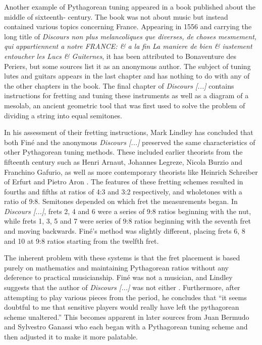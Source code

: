 Another example of Pythagorean tuning appeared in a book published about the middle of sixteenth-
century.  The book was not about music but instead contained various topics concerning France.
Appearing in 1556 and carrying the long title of \textit{Discours non plus melancoliques que
diverses, de choses mesmement, qui appartiennent a notre FRANCE: \& a la fin La maniere de bien \&
iustement entoucher les Lucs \& Guiternes}, it has been attributed to Bonaventure des Periers, but
some sources list it as an anonymous author. The subject of tuning lutes and guitars appears in the
last chapter and has nothing to do with any of the other chapters in the book. The final chapter of
\textit{Discours [...]} contains instructions for fretting and tuning these instruments as well as a
diagram of a mesolab, an ancient geometric tool that was first used to solve the problem of dividing
a string into equal semitones.

In his assessment of their fretting instructions, Mark Lindley has concluded that both
Fin\'{e} and the anonymous \textit{Discours [...]}  preserved the same characteristics of
other Pythagorean tuning methods.  These included earlier theorists from the fifteenth
century such as Henri Arnaut, Johannes Legreze, Nicola Burzio and Franchino Gafurio, as
well as more contemporary theorists like Heinrich Schreiber of Erfurt and Pietro Aron
\autocite[11]{ML:1}. The features of these fretting schemes resulted in fourths and fifths
at ratios of 4:3 and 3:2 respectively, and wholetones with a ratio of 9:8.  Semitones
depended on which fret the measurements began.  In \textit{Discours [...]}, frets 2, 4 and
6 were a series of 9:8 ratios beginning with the nut, while frets 1, 3, 5 and 7 were
series of 9:8 ratios beginning with the seventh fret and moving backwards.  Fin\'{e}'s
method was slightly different, placing frets 6, 8 and 10 at 9:8 ratios starting from the
twelfth fret.

The inherent problem with these systems is that the fret placement is based purely on
mathematics and maintaining Pythagorean ratios without any deference to practical
musicianship. Fin\'{e} was not a musician, and Lindley suggests that the author of
\textit{Discours [...]} was not either \autocite[11]{ML:1}.  Furthermore, after
attempting to play various pieces from the period, he concludes that ``it seems
doubtful to me that sensitive players would really have left the pythagorean scheme
unaltered.'' \autocite[13]{ML:1}  This becomes apparent in later sources from Juan
Bermudo and Sylvestro Ganassi who each began with a Pythagorean tuning scheme and then
adjusted it to make it more palatable.

